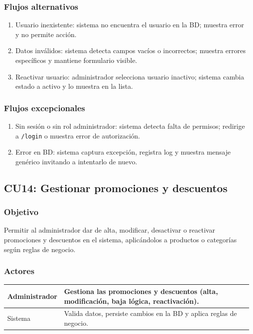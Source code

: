 \documentclass[12pt,a4paper]{article}
\begin{document}
\subsubsection*{Flujos alternativos}
\begin{enumerate}[label=FA-\arabic*]
    \item Usuario inexistente: sistema no encuentra el usuario en la BD; muestra error y no permite acción.
    \item Datos inválidos: sistema detecta campos vacíos o incorrectos; muestra errores específicos y mantiene formulario visible.
    \item Reactivar usuario: administrador selecciona usuario inactivo; sistema cambia estado a activo y lo muestra en la lista.
\end{enumerate}

\subsubsection*{Flujos excepcionales}
\begin{enumerate}[label=FE-\arabic*]
    \item Sin sesión o sin rol administrador: sistema detecta falta de permisos; redirige a \texttt{/login} o muestra error de autorización.
    \item Error en BD: sistema captura excepción, registra log y muestra mensaje genérico invitando a intentarlo de nuevo.
\end{enumerate}


\subsection{CU14: Gestionar promociones y descuentos}
\subsubsection*{Objetivo}
Permitir al administrador dar de alta, modificar, desactivar o reactivar promociones y descuentos en el sistema, aplicándolos a productos o categorías según reglas de negocio.

\subsubsection*{Actores}
\begin{longtable}{|l|p{10cm}|}
    \hline
    Administrador & Gestiona las promociones y descuentos (alta, modificación, baja lógica, reactivación). \\ \hline
    Sistema       & Valida datos, persiste cambios en la BD y aplica reglas de negocio.                    \\ \hline
\end{longtable}
\end{document}
